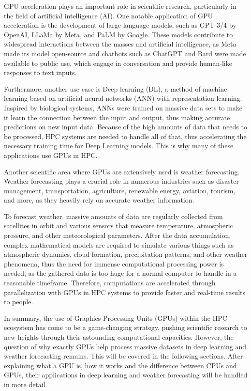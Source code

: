 \documentclass[conference]{IEEEtran}
\begin{document}
GPU acceleration plays an important role in scientific research, particularly in the field of artificial intelligence (AI). 
 One notable application of GPU acceleration is the development of large language models, such as GPT-3/4 by OpenAI, LLaMa by Meta, and PaLM by Google. These models contribute to widespread interactions between the masses and artificial intelligence, as Meta made its model open-source and chatbots such as ChatGPT and Bard were made available to public use, which engage in conversation and provide human-like responses to text inputs. \cite{b19}
 \cite{b20}


Furthermore, another use case is Deep learning (DL), a method of machine learning based on artificial neural networks (ANN) with representation learning. Inspired by biological systems, ANNs were trained on massive data sets to make it learn the connection between the input and output, thus making 
accurate predictions on new input data. Because of the high amounts of data that needs to be processed, HPC systems are needed to handle all of that, thus accelerating the necessary training time for Deep Learning models. This is why many of these applications use GPUs in HPC.



Another scientific area where GPUs are extensively used is weather forecasting. Weather forecasting plays a crucial role in numerous industries such as disaster management, transportation, agriculture, renewable energy, aviation, tourism, and more, as they heavily rely on accurate weather information.

To forecast weather, massive amounts of data are regularly collected from satellites in orbit and various sensors that measure temperature, atmospheric pressure, and other meteorological parameters. After the data accumulation, complex mathematical models are required to simulate various things such as atmospheric dynamics, cloud formation, precipitation patterns, and other weather phenomena, thus the need for immense computational processing power is needed, as the gathered data is too huge for a normal computer to handle in a reasonable timeframe. Therefore, computations are accelerated through parallelization with GPUs in HPC systems to provide faster and real-time results to people. \cite{b21}


In summary, the use of Graphics Processing Units (GPUs) within the HPC ecosystem has come to be a game-changing strategy, pushing scientific research to new heights through their astounding computational capacities. However, the question of why exactly GPUs help process massive datasets in deep learning and weather forecasting remains. This will be covered in the following sections. After explaining what a GPU is, how it works and the difference between CPUs and GPUs, their applications in deep learning and weather forecasting will be handled in more detail.
\end{document}
